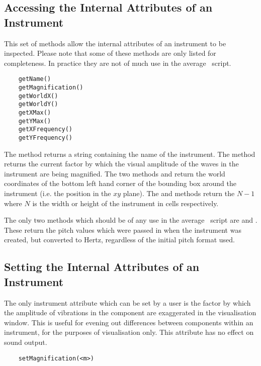 \subsection{Accessing the Internal Attributes of an Instrument}
This set of methods allow the internal attributes of an instrument
to be inspected. Please note that some of these methods are only listed
for completeness. In practice they are not of much use in the
average \tao\ script.

\begin{verbatim}
    getName()
    getMagnification()
    getWorldX()
    getWorldY()
    getXMax()
    getYMax()
    getXFrequency()
    getYFrequency()
\end{verbatim}

The  method returns a string containing the name
of the instrument. The  method returns
the current factor by which the visual amplitude of the waves in the
instrument are being magnified. The two methods 
and  return the world coordinates of the bottom
left hand corner of the bounding box around the instrument (i.e. the
position in the $xy$ plane). The  and
 methods return the $N-1$ where $N$ is the
width or height of the instrument in cells respectively.

The only two methods which should be of any use in the average \tao\
script are  and .
These return the pitch values which were passed in when the instrument
was created, but converted to Hertz, regardless of the initial pitch
format used.

\subsection{Setting the Internal Attributes of an Instrument}
The only instrument attribute which can be set by a user is the
factor by which the amplitude of vibrations in the component are
exaggerated in the visualisation window. This is useful
for evening out differences between components within an instrument,
for the purposes of visualisation only. This attribute has no effect
on sound output.

\begin{verbatim}
    setMagnification(<m>)
\end{verbatim}

